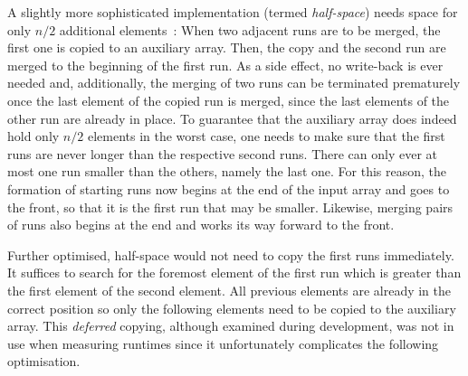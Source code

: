 A slightly more sophisticated implementation (termed \emph{half-space}) needs space for only \(n/2\) additional elements~\cite[Chapter~2.5]{lang2009algorithmen}:
When two adjacent runs are to be merged, the first one is copied to an auxiliary array.
Then, the copy and the second run are merged to the beginning of the first run.
As a side effect, no write-back is ever needed and, additionally, the merging of two runs can be terminated prematurely once the last element of the copied run is merged, since the last elements of the other run are already in place.
To guarantee that the auxiliary array does indeed hold only \(n/2\) elements in the worst case, one needs to make sure that the first runs are never longer than the respective second runs.
There can only ever at most one run smaller than the others, namely the last one.
For this reason, the formation of starting runs now begins at the end of the input array and goes to the front, so that it is the first run that may be smaller.
Likewise, merging pairs of runs also begins at the end and works its way forward to the front.

Further optimised, half-space \MS{} would not need to copy the first runs immediately.
It suffices to search for the foremost element of the first run which is greater than the first element of the second element.
All previous elements are already in the correct position so only the following elements need to be copied to the auxiliary array.
This \emph{deferred} copying, although examined during development, was not in use when measuring runtimes since it unfortunately complicates the following optimisation.


